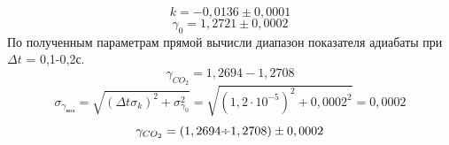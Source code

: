 \documentclass[a4paper]{article}
\begin{document}
\begin{equation*}
	k = -0,0136 \pm 0,0001
\end{equation*}
\begin{equation*}
	\gamma_0 = 1,2721 \pm 0,0002
\end{equation*}
По полученным параметрам прямой вычисли диапазон показателя адиабаты при $\Delta t$ = 0,1-0,2с.
\begin{equation*}
	\gamma_{CO_2} = 1,2694 - 1,2708
\end{equation*}
\begin{equation*}
	\sigma_{\gamma_{\text{воз}}} = \sqrt{(\Delta t\sigma_k)^2 + \sigma_{\gamma_0}^2} = \sqrt{(1,2 \cdot 10^{-5})^2 + 0,0002^2} = 0,0002
\end{equation*}
\begin{equation*}
	\gamma_{CO_2} = (1,2694\text{\textdiv}1,2708) \pm 0,0002
\end{equation*}
\end{document}

